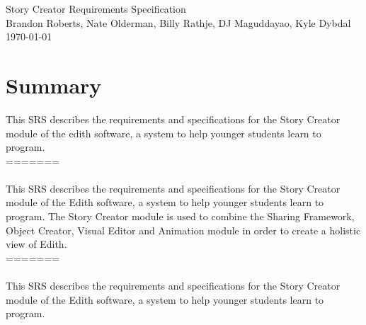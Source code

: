\documentclass[12pt]{article}
\begin{document}

\begin{titlepage}
	\vspace*{\fill} %
	\begin{center}
		{\Huge Story Creator Requirements Specification}\\ [0.5cm]	%
		{\Large Brandon Roberts, Nate Olderman, Billy Rathje, DJ Maguddayao, Kyle Dybdal}\\[0.4cm]
		\today %
	\end{center}
	\vspace*{\fill}
\end{titlepage}

\section{Summary}
This SRS describes the requirements and specifications for the Story Creator module of the edith software, a system to help younger students learn to program. \\

======= \\ \\
This SRS describes the requirements and specifications for the Story Creator module of the Edith software, a system to help younger students learn to program. The Story Creator module is used to combine the Sharing Framework, Object Creator, Visual Editor and Animation module in order to create a holistic view of Edith.  \\

======= \\ \\
This SRS describes the requirements and specifications for the Story Creator module of the Edith software, a system to help younger students learn to program.


\end{document}
